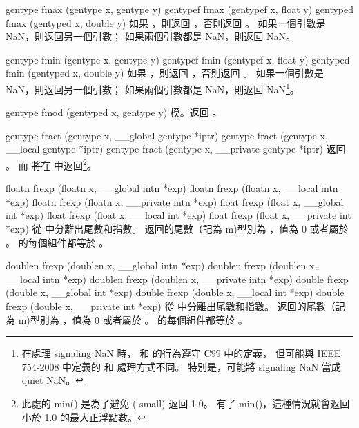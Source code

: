 gentype fmax (gentype x, gentype y)
gentypef fmax (gentypef x, float y)
gentyped fmax (gentyped x, double y)
\stopbuffer
{}
如果 ，則返回 ，否則返回 。
如果一個引數是 NaN，則返回另一個引數；
如果兩個引數都是 NaN，則返回 NaN。
\stopbuffer
\stopbuffer

gentype fmin (gentype x, gentype y)
gentypef fmin (gentypef x, float y)
gentyped fmin (gentyped x, double y)
\stopbuffer
{}
如果 ，則返回 ，否則返回 。
如果一個引數是 NaN，則返回另一個引數；
如果兩個引數都是 NaN，則返回 NaN\footnote{
在處理 signaling NaN 時，  和  的行為遵守 C99 中的定義，
但可能與 IEEE 754-2008 中定義的  和  處理方式不同。
特別是，可能將 signaling NaN 當成 quiet NaN。}。
\stopbuffer

gentype fmod (gentyped x, gentype y)
\stopbuffer
{}
模。返回 。
\stopbuffer

gentype fract (gentype x,
	__global gentype *iptr)
gentype fract (gentype x,
	__local gentype *iptr)
gentype fract (gentype x,
	__private gentype *iptr)
\stopbuffer
{}
返回 。
而  將在  中返回\footnote{
此處的 min() 是為了避免 (-small) 返回 1.0。
有了 min()，這種情況就會返回小於 1.0 的最大正浮點數。}。
\stopbuffer

floatn frexp (floatn x,
	__global intn *exp)
floatn frexp (floatn x,
	__local intn *exp)
floatn frexp (floatn x,
	__private intn *exp)
float frexp (float x,
	__global int *exp)
float frexp (float x,
	__local int *exp)
float frexp (float x,
	__private int *exp)
\stopbuffer
{}
從  中分離出尾數和指數。
返回的尾數（記為 m)型別為 ，值為 0 或者屬於 \math{[1/2, 1)}。
 的每個組件都等於 。
\stopbuffer

doublen frexp (doublen x,
	__global intn *exp)
doublen frexp (doublen x,
	__local intn *exp)
doublen frexp (doublen x,
	__private intn *exp)
double frexp (double x,
	__global int *exp)
double frexp (double x,
	__local int *exp)
double frexp (double x,
	__private int *exp)
\stopbuffer
{}
從  中分離出尾數和指數。
返回的尾數（記為 m)型別為 ，值為 0 或者屬於 \math{[1/2, 1)}。
 的每個組件都等於 。
\stopbuffer

